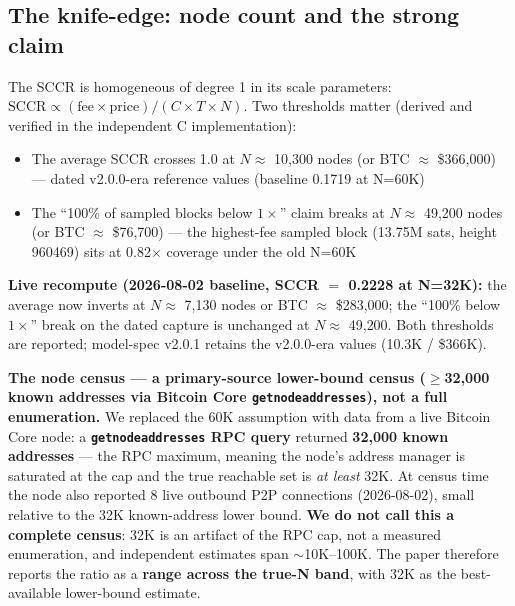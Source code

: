 \documentclass[11pt]{article}
\begin{document}
\subsection{The knife-edge: node count and the strong claim}\label{sec:5.4}
The SCCR is homogeneous of degree 1 in its scale parameters: $\mathrm{SCCR} \propto (\mathrm{fee} \times \mathrm{price}) / (C \times T \times N)$. Two thresholds matter (derived and verified in the independent C implementation):
\begin{itemize}[nosep]
  \item The average SCCR crosses 1.0 at $N \approx$ 10{,}300 nodes (or BTC $\approx$ \$366{,}000) --- dated v2.0.0-era reference values (baseline 0.1719 at N=60K)
  \item The ``100\% of sampled blocks below $1\times$'' claim breaks at $N \approx$ 49{,}200 nodes (or BTC $\approx$ \$76{,}700) --- the highest-fee sampled block (13.75M sats, height 960469) sits at 0.82$\times$ coverage under the old N=60K
\end{itemize}
\textbf{Live recompute (2026-08-02 baseline, SCCR $=$ 0.2228 at N=32K):} the average now inverts at $N \approx$ 7{,}130 nodes or BTC $\approx$ \$283{,}000; the ``100\% below $1\times$'' break on the dated capture is unchanged at $N \approx$ 49{,}200. Both thresholds are reported; model-spec v2.0.1 retains the v2.0.0-era values (10.3K / \$366K).

\textbf{The node census --- a primary-source lower-bound census ($\geq$32{,}000 known addresses via Bitcoin Core \texttt{getnodeaddresses}), not a full enumeration.} We replaced the 60K assumption with data from a live Bitcoin Core node: a \textbf{\texttt{getnodeaddresses} RPC query} returned \textbf{32{,}000 known addresses} --- the RPC maximum, meaning the node's address manager is saturated at the cap and the true reachable set is \emph{at least} 32K. At census time the node also reported 8 live outbound P2P connections (2026-08-02), small relative to the 32K known-address lower bound. \textbf{We do not call this a complete census}: 32K is an artifact of the RPC cap, not a measured enumeration, and independent estimates span $\sim$10K--100K. The paper therefore reports the ratio as a \textbf{range across the true-N band}, with 32K as the best-available lower-bound estimate.
\end{document}
